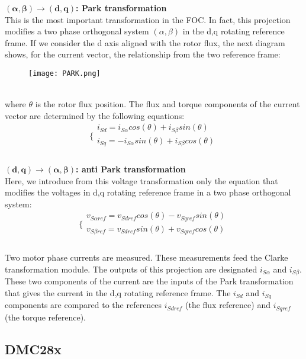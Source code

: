 \documentclass[12pt]{article}
\begin{document}
\textbf{$\boldsymbol{(\alpha,\beta)\rightarrow (d,q)}$: Park transformation}\\

This is the most important transformation in the FOC. In fact, this projection modifies a
two phase orthogonal system $(\alpha,\beta)$ in the d,q rotating reference frame. If we consider the
d axis aligned with the rotor flux, the next diagram shows, for the current vector, the
relationship from the two reference frame:
\begin{figure}[h]
\centering
\texttt{[image: PARK.png]}
\end{figure}\\
where $\theta$ is the rotor flux position. The flux and torque components of the current vector
are determined by the following equations:\\
$$\bigg \{
\begin{array}{lr}
i_{Sd} = i_{S\alpha}cos(\theta)+i_{S\beta}sin(\theta)\\
i_{Sq} = -i_{S\alpha}sin(\theta)+i_{S\beta}cos(\theta)\\
\end{array}
$$\\

\textbf{$\boldsymbol{(d,q)\rightarrow (\alpha,\beta)}$: anti Park transformation}\\
Here, we introduce from this voltage transformation only the equation that modifies the
voltages in d,q rotating reference frame in a two phase orthogonal system:\\
$$\bigg \{
\begin{array}{lr}
v_{S\alpha ref} = v_{Sdref}cos(\theta)-v_{Sqref}sin(\theta)\\
v_{S\beta ref} = v_{Sdref}sin(\theta)+v_{Sqref}cos(\theta)\\
\end{array}
$$\\
Two motor phase currents are measured. These measurements feed the Clarke
transformation module. The outputs of this projection are designated $i_{S\alpha}$ and $i_{S\beta}$.\\
These two components of the current are the inputs of the Park transformation that gives the
current in the d,q rotating reference frame. The $i_{Sd}$ and $i_{Sq}$ components are compared to the
references $i_{Sdref}$ (the flux reference) and $i_{Sqref}$ (the torque reference).

\subsection{DMC28x}
\end{document}
